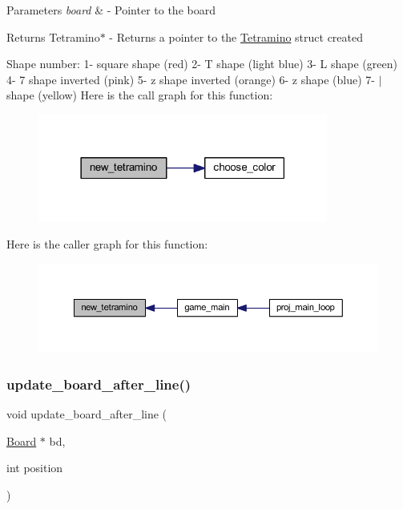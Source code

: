 \begin{DoxyParams}{Parameters}
{\em board} & -\/ Pointer to the board \\
\hline
\end{DoxyParams}
\begin{DoxyReturn}{Returns}
Tetramino$\ast$ -\/ Returns a pointer to the \mbox{\hyperlink{struct_tetramino}{Tetramino}} struct created
\end{DoxyReturn}
Shape number\+: 1-\/ square shape (red) 2-\/ T shape (light blue) 3-\/ L shape (green) 4-\/ 7 shape inverted (pink) 5-\/ z shape inverted (orange) 6-\/ z shape (blue) 7-\/ $\vert$ shape (yellow) Here is the call graph for this function\+:
\nopagebreak
\begin{figure}[H]
\begin{center}
\leavevmode
\includegraphics[width=270pt]{group__tetramino_ga9a2309ca24e8dec1a1bf31a995db2de1_cgraph}
\end{center}
\end{figure}
Here is the caller graph for this function\+:
\nopagebreak
\begin{figure}[H]
\begin{center}
\leavevmode
\includegraphics[width=350pt]{group__tetramino_ga9a2309ca24e8dec1a1bf31a995db2de1_icgraph}
\end{center}
\end{figure}
\mbox{\label{group__tetramino_ga2f2a68722efc3ecbd82eea0a337f6b7f}} 
\subsubsection{\texorpdfstring{update\+\_\+board\+\_\+after\+\_\+line()}{update\_board\_after\_line()}}
{\footnotesize\ttfamily void update\+\_\+board\+\_\+after\+\_\+line (\begin{DoxyParamCaption}\item[{\mbox{\hyperlink{struct_board}{Board}} $\ast$}]{bd,  }\item[{int}]{position }\end{DoxyParamCaption})}




